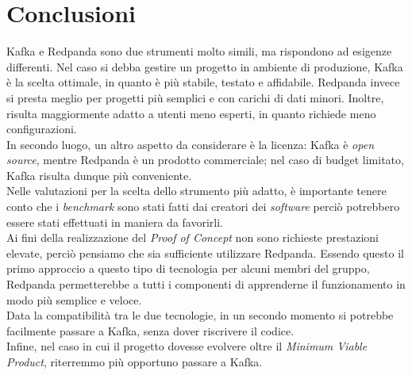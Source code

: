 \section{Conclusioni}
Kafka e Redpanda sono due strumenti molto simili, ma rispondono ad esigenze differenti.
Nel caso si debba gestire un progetto in ambiente di produzione, Kafka è la scelta ottimale, in quanto è più stabile, testato e affidabile.
Redpanda invece si presta meglio per progetti più semplici e con carichi di dati minori. Inoltre, risulta maggiormente adatto a utenti meno esperti, in quanto richiede meno configurazioni. \\
In secondo luogo, un altro aspetto da considerare è la licenza: Kafka è \textit{open source}, mentre Redpanda è un prodotto commerciale; nel caso di
budget limitato, Kafka risulta dunque più conveniente.\\
Nelle valutazioni per la scelta dello strumento più adatto, è importante tenere conto che i \textit{benchmark} sono stati fatti dai creatori dei \textit{software}
perciò potrebbero essere stati effettuati in maniera da favorirli.\\
Ai fini della realizzazione del \textit{Proof of Concept} non sono richieste prestazioni elevate, perciò pensiamo che sia sufficiente utilizzare Redpanda.
Essendo questo il primo approccio a questo tipo di tecnologia per alcuni membri del gruppo, Redpanda permetterebbe a tutti i componenti di apprenderne
il funzionamento in modo più semplice e veloce.\\
Data la compatibilità tra le due tecnologie, in un secondo momento si potrebbe facilmente passare a Kafka, senza dover riscrivere il codice.\\
Infine, nel caso in cui il progetto dovesse evolvere oltre il \textit{Minimum Viable Product}, riterremmo più opportuno passare a Kafka.



